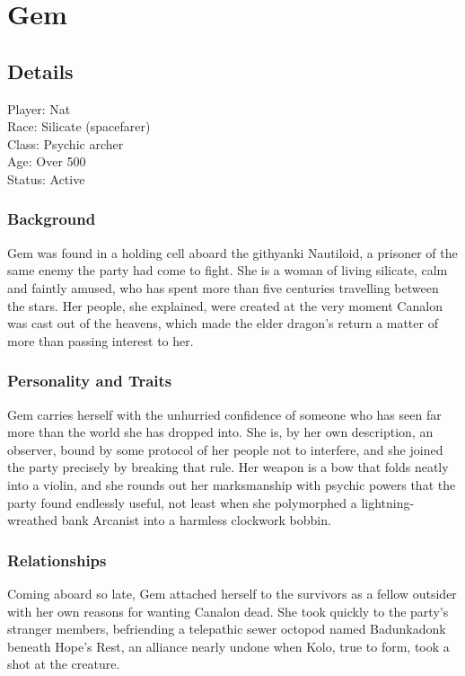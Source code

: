 \section{Gem}

\subsection*{Details}

\noindent

Player: Nat \\
Race: 	Silicate (spacefarer) \\
Class: 	Psychic archer \\
Age: 	Over 500 \\
Status: Active

\subsubsection{Background}

Gem was found in a holding cell aboard the githyanki Nautiloid, a prisoner of the same enemy the party had come to fight. She is a woman of living silicate, calm and faintly amused, who has spent more than five centuries travelling between the stars. Her people, she explained, were created at the very moment Canalon was cast out of the heavens, which made the elder dragon's return a matter of more than passing interest to her.

\subsubsection{Personality and Traits}

Gem carries herself with the unhurried confidence of someone who has seen far more than the world she has dropped into. She is, by her own description, an observer, bound by some protocol of her people not to interfere, and she joined the party precisely by breaking that rule. Her weapon is a bow that folds neatly into a violin, and she rounds out her marksmanship with psychic powers that the party found endlessly useful, not least when she polymorphed a lightning-wreathed bank Arcanist into a harmless clockwork bobbin.

\subsubsection{Relationships}

Coming aboard so late, Gem attached herself to the survivors as a fellow outsider with her own reasons for wanting Canalon dead. She took quickly to the party's stranger members, befriending a telepathic sewer octopod named Badunkadonk beneath Hope's Rest, an alliance nearly undone when Kolo, true to form, took a shot at the creature.

